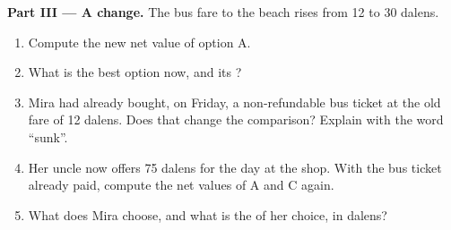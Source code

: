 \begin{problem}
\medskip
\noindent\textbf{Part III --- A change.} The bus fare to the beach rises from 12 to 30
dalens.
\begin{enumerate}[resume]
  \item Compute the new net value of option A.
  \item What is the best option now, and its ?
  \item Mira had already bought, on Friday, a non-refundable bus ticket at the old fare
        of 12 dalens. Does that change the comparison? Explain with the word ``sunk''.
  \item Her uncle now offers 75 dalens for the day at the shop. With the bus ticket
        already paid, compute the net values of A and C again.
  \item What does Mira choose, and what is the  of her choice, in
        dalens?
\end{enumerate}
\end{problem}
